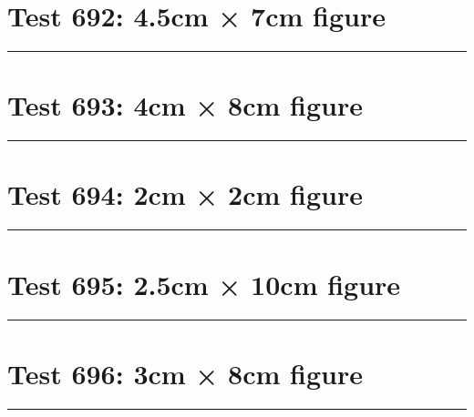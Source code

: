 \documentclass[a4paper,11pt]{article}
\begin{document}
\section*{Test 692: 4.5cm × 7cm figure}
\begin{swarmwrap}%
  \begin{minipage}[t]{4cm}
    \centering
    \rule{\linewidth}{7cm}
  \end{minipage}%
\end{swarmwrap}%
\swarmwrapnext
\lipsum[13]
\lipsum[14]
\lipsum[15]
\lipsum[16]
\section*{Test 693: 4cm × 8cm figure}
\begin{swarmwrap}%
  \begin{minipage}[t]{4cm}
    \centering
    \rule{\linewidth}{8cm}
  \end{minipage}%
\end{swarmwrap}%
\swarmwrapnext
\lipsum[112]
\lipsum[113]
\lipsum[114]
\lipsum[115]
\lipsum[116]
\section*{Test 694: 2cm × 2cm figure}
\begin{swarmwrap}%
  \begin{minipage}[t]{2cm}
    \centering
    \rule{\linewidth}{2cm}
  \end{minipage}%
\end{swarmwrap}%
\swarmwrapnext
\lipsum[68]
\lipsum[69]
\lipsum[70]
\section*{Test 695: 2.5cm × 10cm figure}
\begin{swarmwrap}%
  \begin{minipage}[t]{2cm}
    \centering
    \rule{\linewidth}{10cm}
  \end{minipage}%
\end{swarmwrap}%
\swarmwrapnext
\lipsum[116]
\lipsum[117]
\lipsum[118]
\lipsum[119]
\section*{Test 696: 3cm × 8cm figure}
\begin{swarmwrap}%
  \begin{minipage}[t]{3cm}
    \centering
    \rule{\linewidth}{8cm}
  \end{minipage}%
\end{swarmwrap}%
\swarmwrapnext
\lipsum[130]
\lipsum[131]
\lipsum[132]
\lipsum[133]
\lipsum[134]
\lipsum[135]
\end{document}
